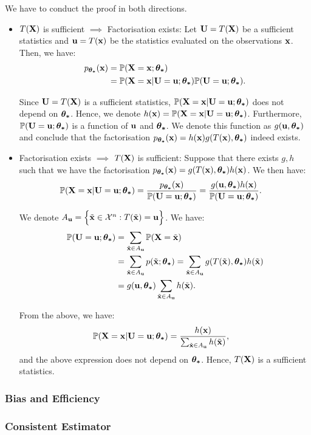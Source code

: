 \begin{proof*}
    We have to conduct the proof in both directions.
    \begin{itemize}
        \item $T({\bf X})$ is sufficient $\implies$ Factorisation exists:
        Let ${\bf U}=T({\bf X})$ be a sufficient statistics and ${\bf u} = T({\bf x})$ be the statistics evaluated on the observations ${\bf x}$. Then, we have:
        \begin{align*}
            p_{\boldsymbol{\theta_*}}({\bf x}) &= \mathbb{P}({\bf X}={\bf x}; \boldsymbol{\theta_*}) \\ 
                &= \mathbb{P}({\bf X}={\bf x} | {\bf U}={\bf u}; \boldsymbol{\theta_*}) \mathbb{P}({\bf U}={\bf u};\boldsymbol{\theta_*}).
        \end{align*} 

        \noindent Since ${\bf U}=T({\bf X})$ is a sufficient statistics, $\mathbb{P}({\bf X}={\bf x}|{\bf U}={\bf u};\boldsymbol{\theta_*})$ does not depend on $\boldsymbol{\theta_*}$. Hence, we denote $h({\bf x}) = \mathbb{P}({\bf X}={\bf x}|{\bf U}={\bf u};\boldsymbol{\theta_*})$. Furthermore, $\mathbb{P}({\bf U}={\bf u};\boldsymbol{\theta_*})$ is a function of ${\bf u}$ and $\boldsymbol{\theta_*}$. We denote this function as $g({\bf u}, \boldsymbol{\theta_*})$ and conclude that the factorisation $p_{\boldsymbol{\theta_*}}({\bf x})=h({\bf x})g(T({\bf x}),\boldsymbol{\theta_*})$ indeed exists. 

        \item Factorisation exists $\implies$ $T({\bf X})$ is sufficient: Suppose that there exists $g, h$ such that we have the factorisation $p_{\boldsymbol{\theta_*}}({\bf x})=g(T({\bf x}), \boldsymbol{\theta_*})h({\bf x})$. We then have:
        \begin{align*}
            \mathbb{P}({\bf X} = {\bf x}|{\bf U} = {\bf u};\boldsymbol{\theta_*}) &=  \frac{p_{\boldsymbol{\theta_*}}({\bf x})}{\mathbb{P}({\bf U}={\bf u};\boldsymbol{\theta_*})} = \frac{g({\bf u}, \boldsymbol{\theta_*})h({\bf x})}{\mathbb{P}({\bf U}={\bf u};\boldsymbol{\theta_*})}.
        \end{align*} 

        \noindent We denote $A_{\bf u} = \Big\{ \tilde{{\bf x}} \in \mathcal{X}^n : T(\tilde{{\bf x}}) = {\bf u} \Big\}$. We have:
        \begin{align*}
            \mathbb{P}({\bf U} = {\bf u};\boldsymbol{\theta_*}) &= \sum_{\tilde {{\bf x}} \in A_{\bf u}} \mathbb{P}({\bf X} = \tilde{{\bf x}}) \\ 
                &= \sum_{\tilde{{\bf x}}\in A_{\bf u}} p(\tilde{{\bf x}};\boldsymbol{\theta_*}) = \sum_{\tilde{{\bf x}}\in A_{\bf u}} g(T(\tilde{{\bf x}}), \boldsymbol{\theta_*})h(\tilde{{\bf x}}) \\ 
                &= g({\bf u}, \boldsymbol{\theta_*}) \sum_{\tilde{{\bf x}}\in A_{\bf u}} h(\tilde{{\bf x}}).
        \end{align*} 

        \noindent From the above, we have:
        \begin{align*}
            \mathbb{P}({\bf X}={\bf x}|{\bf U}={\bf u};\boldsymbol{\theta_*}) &= \frac{h({\bf x})}{\sum_{\tilde{{\bf x}}\in A_{\bf u}} h(\tilde{{\bf x}})},
        \end{align*} 
        \noindent and the above expression does not depend on $\boldsymbol{\theta_*}$. Hence, $T({\bf X})$ is a sufficient statistics.
    \end{itemize}
\end{proof*}

\subsubsection{Bias and Efficiency} 

\subsubsection{Consistent Estimator}

